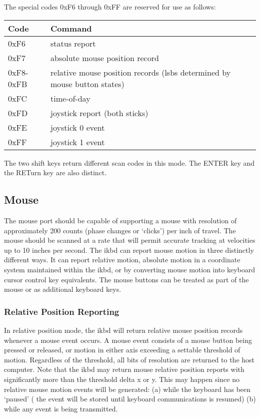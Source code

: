 \documentclass[a4paper,8pt,english]{sphinxmanual}
\begin{document}
The special codes 0xF6 through 0xFF are reserved for use as follows:

\begin{tabulary}{\linewidth}{|L|L|}
\hline
\textsf{\relax 
Code
} & \textsf{\relax 
Command
}\\
\hline
0xF6
 & 
status report
\\
\hline
0xF7
 & 
absolute mouse position record
\\
\hline
0xF8-0xFB
 & 
relative mouse position records (lsbs determined by
mouse button states)
\\
\hline
0xFC
 & 
time-of-day
\\
\hline
0xFD
 & 
joystick report (both sticks)
\\
\hline
0xFE
 & 
joystick 0 event
\\
\hline
0xFF
 & 
joystick 1 event
\\
\hline\end{tabulary}


The two shift keys return different scan codes in this mode. The ENTER key
and the RETurn key are also distinct.


\subsection{Mouse}
\label{input/devices/atarikbd:mouse}
The mouse port should be capable of supporting a mouse with resolution of
approximately 200 counts (phase changes or `clicks') per inch of travel. The
mouse should be scanned at a rate that will permit accurate tracking at
velocities up to 10 inches per second.
The ikbd can report mouse motion in three distinctly different ways. It can
report relative motion, absolute motion in a coordinate system maintained
within the ikbd, or by converting mouse motion into keyboard cursor control
key equivalents.
The mouse buttons can be treated as part of the mouse or as additional
keyboard keys.


\subsubsection{Relative Position Reporting}
\label{input/devices/atarikbd:relative-position-reporting}
In relative position mode, the ikbd will return relative mouse position
records whenever a mouse event occurs. A mouse event consists of a mouse
button being pressed or released, or motion in either axis exceeding a
settable threshold of motion. Regardless of the threshold, all bits of
resolution are returned to the host computer.
Note that the ikbd may return mouse relative position reports with
significantly more than the threshold delta x or y. This may happen since no
relative mouse motion events will be generated: (a) while the keyboard has
been `paused' ( the event will be stored until keyboard communications is
resumed) (b) while any event is being transmitted.
\end{document}

